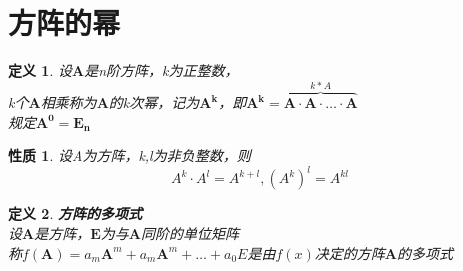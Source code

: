 \documentclass[a4paper]{ctexbook}
\newtheorem{definition}{定义}[section]
\newtheorem{property}[section]{性质}
\begin{document}
\section{方阵的幂}
\begin{definition}
    设\(\mathbf{A}\)是n阶方阵，k为正整数，
    \\k个\(\mathbf{A}\)相乘称为\(\mathbf{A}\)的k次幂，记为\(\mathbf{A^k}\)，即\(\mathbf{A^k}= \overbrace{\mathbf{A}\cdot \mathbf{A}\cdot \dots \cdot \mathbf{A}}^{k*A} \)
    \\规定\(\mathbf{A^0}=\mathbf{E_n}\)    
\end{definition}
\begin{property}
    设A为方阵，k,l为非负整数，则
    \[A^k \cdot A^l=A^{k+l} , (A^k)^l=A^{kl}\]
\end{property}
\begin{definition}
    \textbf{方阵的多项式}
    \\ 设\(\mathbf{A}\)是方阵，\(\mathbf{E}\)为与\(\mathbf{A}\)同阶的单位矩阵 \\
    称\(f(\mathbf{A})=a_m\mathbf{A}^m+a_m\mathbf{A}^m+ \dots + a_0E\)是由\(f(x)\)决定的方阵\(\mathbf{A}\)的多项式
\end{definition}
\end{document}
